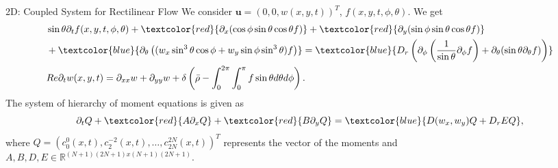 \begin{frame}{2D: Coupled System for Rectilinear Flow}
	\scriptsize
	We consider $\boldsymbol{u} = \left( 0, 0, w(x,y, t)\right)^T$, $f(x,y,t,\phi,\theta)$. We get
	\begin{equation}
		\begin{aligned}
			&\sin\theta \partial_{t}f(x,y,t,\phi, \theta)+ \textcolor{red}{\partial_x(\cos\phi \sin\theta \cos\theta f)} + \textcolor{red}{\partial_y(\sin \phi \sin \theta \cos \theta f)} \\
			&+ \textcolor{blue}{\partial_\theta\left(( w_x \sin^3 \theta \cos \phi + w_y\sin \phi \sin^3 \theta) f\right)}
			= \textcolor{blue}{D_{r}\left( \partial_\phi \left(\frac{1}{\sin \theta} \partial_\phi f \right)+ \partial_\theta (\sin \theta \partial_\theta f)\right)} \\
			&Re\partial_{t}w(x,y,t) = \partial_{xx}w + \partial_{yy}w + \delta\left(\bar{\rho}-\int_{0}^{2\pi} \int_{0}^{\pi} f \sin \theta d\theta d\phi \right).
		\end{aligned}
	\end{equation}
	\pause
	The system of hierarchy of moment equations is given as
	\begin{equation}
		\partial_t Q + \textcolor{red}{A  \partial_x Q}
		+ \textcolor{red}{B \partial_y Q} =  \textcolor{blue}{ D(w_x,w_y)Q+ D_rEQ},
	\end{equation}
    where $Q=(c^0_0(x,t), c^{-2}_2(x,t), \ldots, c^{2N}_{2N}(x,t))^T$ represents the vector of the moments and \\
    \vspace{2mm}
    $A,B,D,E \in \mathbb{R}^{(N+1)(2N+1)x(N+1)(2N+1)}$.
\end{frame}


